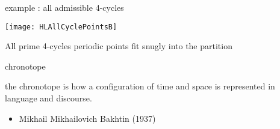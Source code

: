 \begin{frame}{example : all admissible 4-cycles}
\begin{center}
\texttt{[image: HLAllCyclePointsB]}
\end{center}


All prime 4-cycles periodic points fit snugly into the partition

\end{frame}

\begin{frame}{chronotope
}
\begin{bartlett}{
the chronotope is how a
configuration of time and space is represented in language and
discourse.
                }
\end{bartlett}

\bigskip
\bigskip

\begin{itemize}
  \item Mikhail Mikhailovich Bakhtin (1937)
\end{itemize}
\end{frame}


